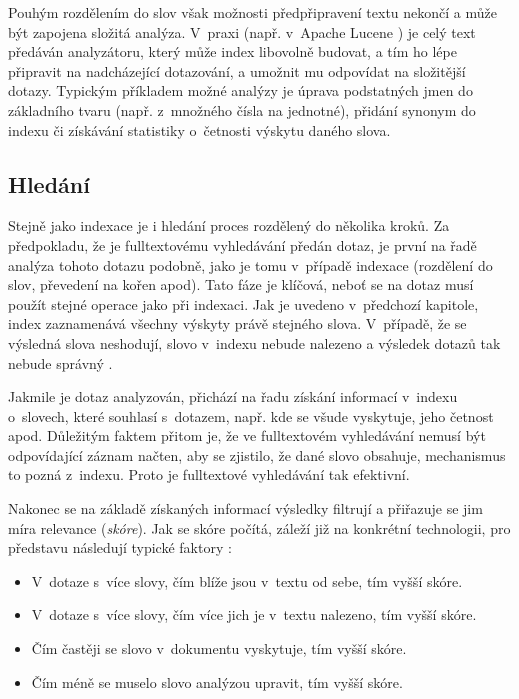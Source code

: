 \documentclass[11pt,oneside]{fithesis2}
\begin{document}
Pouhým rozdělením do slov však možnosti předpřipravení textu nekončí a může být zapojena složitá analýza. V~praxi (např. v~Apache Lucene \cite[s.~35]{LuceneAction}) je celý text předáván analyzátoru, který může index libovolně budovat, a tím ho lépe připravit na nadcházející dotazování, a umožnit mu odpovídat na složitější dotazy. Typickým příkladem možné analýzy je úprava podstatných jmen do základního tvaru (např. z~množného čísla na jednotné), přidání synonym do indexu či získávání statistiky o~četnosti výskytu daného slova.

\subsection{Hledání}

Stejně jako indexace je i hledání proces rozdělený do několika kroků. Za předpokladu, že je fulltextovému vyhledávání předán dotaz, je první na řadě analýza tohoto dotazu podobně, jako je tomu v~případě indexace (rozdělení do slov, převedení na kořen apod). Tato fáze je klíčová, neboť se na dotaz musí použít stejné operace jako při indexaci.  Jak je uvedeno v~předchozí kapitole, index zaznamenává všechny výskyty právě stejného slova. V~případě, že se výsledná slova neshodují, slovo v~indexu nebude nalezeno a výsledek dotazů tak nebude správný \cite[str. 16]{HibernateSearchAction}.

Jakmile je dotaz analyzován, přichází na řadu získání informací v~indexu o~slovech, které souhlasí s~dotazem, např. kde se všude vyskytuje, jeho četnost apod. Důležitým faktem přitom je, že ve fulltextovém vyhledávání nemusí být odpovídající záznam načten, aby se zjistilo, že dané slovo obsahuje, mechanismus to pozná z~indexu. Proto je fulltextové vyhledávání tak efektivní.

Nakonec se na základě získaných informací výsledky filtrují a přiřazuje se jim míra relevance (\emph{skóre}). Jak se skóre počítá, záleží již na konkrétní technologii, pro představu následují typické faktory \cite[str. 16]{HibernateSearchAction}:
\begin{itemize}
	\item V~dotaze s~více slovy, čím blíže jsou v~textu od sebe, tím vyšší skóre.
	\item V~dotaze s~více slovy, čím více jich je v~textu nalezeno, tím vyšší skóre.
	\item Čím častěji se slovo v~dokumentu vyskytuje, tím vyšší skóre.
	\item Čím méně se muselo slovo analýzou upravit, tím vyšší skóre.
\end{itemize}
\end{document}
